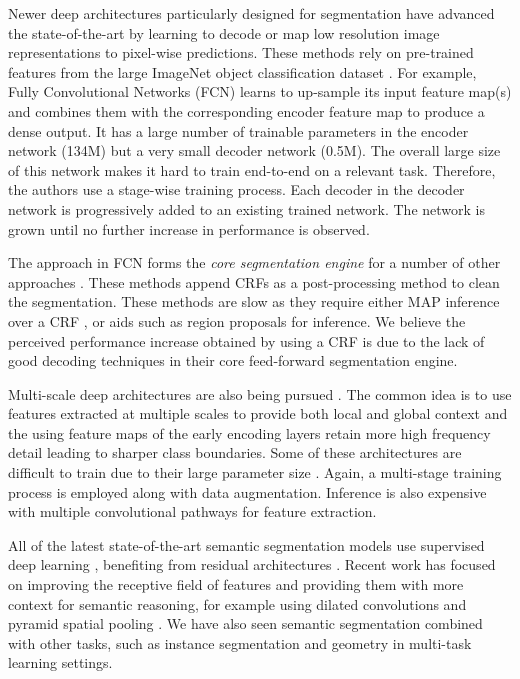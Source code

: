 Newer deep architectures \citep{long2015fully,NohDeconvNets,eigen2015predicting,DecoupledNet,CRFRNN} particularly designed for segmentation have advanced the state-of-the-art by learning to decode or map low resolution image representations to pixel-wise predictions. These methods rely on pre-trained features from the large ImageNet object classification dataset \citep{deng2009imagenet}. For example, Fully Convolutional Networks (FCN) \citep{long2015fully} learns to up-sample its input feature map(s) and combines them with the corresponding encoder feature map to produce a dense output. It has a large number of trainable parameters in the encoder network (134M) but a very small decoder network (0.5M). The overall large size of this network makes it hard to train end-to-end on a relevant task. Therefore, the authors use a stage-wise training process. Each decoder in the decoder network is progressively added to an existing trained network. The network is grown until no further increase in performance is observed. 

The approach in FCN forms the \textit{core segmentation engine} for a number of other approaches \citep{ParseNetRabinovich,UrtasunSegmentation,CRFRNN,chen2016deeplab}. These methods append CRFs as a post-processing method to clean the segmentation. These methods are slow as they require either MAP inference over a CRF \citep{lin2015efficient}, \citep{UrtasunSegmentation} or aids such as region proposals \citep{NohDeconvNets} for inference. We believe the perceived performance increase obtained by using a CRF is due to the lack of good decoding techniques in their core feed-forward segmentation engine. 

Multi-scale deep architectures are also being pursued \citep{eigen2015predicting,lin2015efficient,hariharan2015hypercolumns,ParseNetRabinovich}. The common idea is to use features extracted at multiple scales to provide both local and global context \citep{mostajabi2014feedforward} and the using feature maps of the early encoding layers retain more high frequency detail leading to sharper class boundaries. Some of these architectures are difficult to train due to their large parameter size \citep{eigen2015predicting}. Again, a multi-stage training process is employed along with data augmentation. Inference is also expensive with multiple convolutional pathways for feature extraction.

All of the latest state-of-the-art semantic segmentation models use supervised deep learning \citep{badrinarayanan2017segnet,long2015fully}, benefiting from residual architectures \citep{he2016deep,huang2017densely}. Recent work has focused on improving the receptive field of features and providing them with more context for semantic reasoning, for example using dilated convolutions \citep{YuKoltun2016} and pyramid spatial pooling \citep{zhao2017pspnet}. We have also seen semantic segmentation combined with other tasks, such as instance segmentation \citep{he2017maskrcnn} and geometry \citep{kendall2017multi} in multi-task learning settings.

